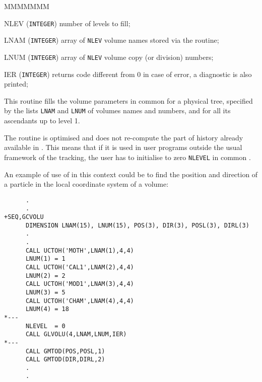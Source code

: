                 
                

\begin{DLtt}{MMMMMMM}
\item[NLEV] ({\tt INTEGER}) number of levels to fill;
\item[LNAM] ({\tt INTEGER}) array of {\tt NLEV} volume names stored
via the  routine;
\item[LNUM] ({\tt INTEGER}) array of {\tt NLEV} volume copy (or 
division) numbers;
\item[IER] ({\tt INTEGER}) returns code different from 0 in case of 
error, a diagnostic is also printed;
\end{DLtt}

This routine fills the volume parameters in common 
for a physical tree, specified by the lists {\tt LNAM} and {\tt LNUM} of
volumes names and numbers, and for all its ascendants up to
level 1.

The routine is optimised and does not re-compute the part of
history already available in . This means that if
it is used in user programs outside the usual framework of the tracking,
the user has to initialise to zero {\tt NLEVEL} in common .

An example of use of  in this context could be to find the
position and direction of a particle in the local coordinate system of
a volume:
\begin{verbatim}
      .
      .
+SEQ,GCVOLU
      DIMENSION LNAM(15), LNUM(15), POS(3), DIR(3), POSL(3), DIRL(3)
      .
      .
      CALL UCTOH('MOTH',LNAM(1),4,4)
      LNUM(1) = 1
      CALL UCTOH('CAL1',LNAM(2),4,4)
      LNUM(2) = 2
      CALL UCTOH('MOD1',LNAM(3),4,4)
      LNUM(3) = 5
      CALL UCTOH('CHAM',LNAM(4),4,4)
      LNUM(4) = 18
*---
      NLEVEL  = 0
      CALL GLVOLU(4,LNAM,LNUM,IER)
*---
      CALL GMTOD(POS,POSL,1)
      CALL GMTOD(DIR,DIRL,2)
      .
      .
\end{verbatim}

